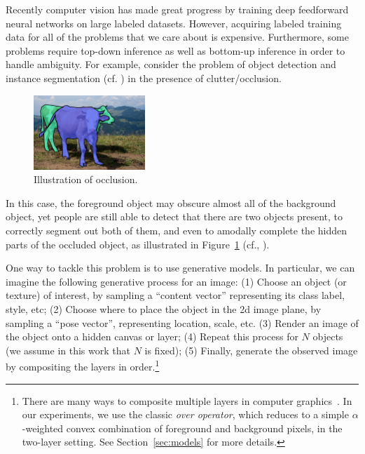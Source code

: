 

Recently computer vision has made great progress by training deep
feedforward neural networks on large labeled datasets.
However, acquiring labeled training data for all of the problems that
we care about is expensive.
Furthermore, some problems require top-down inference as well as
bottom-up inference in order to handle ambiguity.
For example, consider the problem of object detection
and instance segmentation (cf. \cite{Hariharan2014})  in the
presence of clutter/occlusion. 

\begin{figure}
\vspace{-4mm}
\begin{center}
    \includegraphics[width=0.375\textwidth]{figs/two_cows.png} \vspace{-2mm}
    \caption{\footnotesize Illustration of occlusion.}
    \label{fig:cows}
  \end{center}
  \vspace{-2mm}
\end{figure}

In this case, the foreground object may
obscure almost all of the background object, yet people are still able
to detect that there are two objects present, to correctly segment
out both of them, and even to amodally complete the hidden parts of
the occluded object, as illustrated in Figure~\ref{fig:cows} (cf., \cite{Kar2015}).



One way to tackle this problem is to use generative models.
In particular, we can imagine the following generative process for an image:
(1) Choose an object (or texture) of interest, by sampling a ``content vector''
representing its class label, style, etc;
(2) Choose where to
place the object in the 2d image plane, by sampling a ``pose vector'',
representing location, scale, etc. 
(3) Render an image of the object onto a hidden canvas or layer;
(4) Repeat this process for $N$
objects (we assume in this work that $N$ is fixed);
(5) Finally, generate
the observed image by compositing the layers in order.\footnote{
%
There are many  ways to composite multiple layers in computer
graphics~\citep{porter1984compositing}. 
In our experiments, we use  the classic \emph{over operator}, which
reduces to a simple $\alpha$-weighted 
convex combination of foreground and background pixels,
in the two-layer setting.
 See Section~\ref{sec:models} for more details.
}

